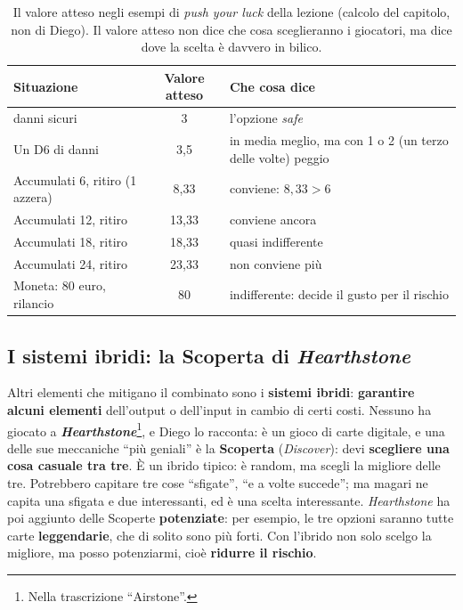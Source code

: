 \begin{table}[htbp]
\centering
\small
\begin{tabular}{@{}>{\raggedright\arraybackslash}p{4.6cm}c>{\raggedright\arraybackslash}p{6.6cm}@{}}
\toprule
\textbf{Situazione} & \textbf{Valore atteso} & \textbf{Che cosa dice} \\
\midrule
3 danni sicuri & 3 & l'opzione \emph{safe} \\
Un D6 di danni & 3,5 & in media meglio, ma con 1 o 2 (un terzo delle volte) peggio \\
\addlinespace
Accumulati 6, ritiro (1 azzera) & 8,33 & conviene: $8{,}33 > 6$ \\
Accumulati 12, ritiro & 13,33 & conviene ancora \\
Accumulati 18, ritiro & 18,33 & quasi indifferente \\
Accumulati 24, ritiro & 23,33 & non conviene più \\
\addlinespace
Moneta: 80 euro, rilancio & 80 & indifferente: decide il gusto per il rischio \\
\bottomrule
\end{tabular}
\caption{Il valore atteso negli esempi di \emph{push your luck} della lezione (calcolo del
capitolo, non di Diego). Il valore atteso non dice che cosa sceglieranno i giocatori, ma dice
dove la scelta è davvero in bilico.}
\label{a15:tab:push}
\end{table}

\subsection{I sistemi ibridi: la Scoperta di \emph{Hearthstone}}

Altri elementi che mitigano il combinato sono i \textbf{sistemi ibridi}: \textbf{garantire
alcuni elementi} dell'output o dell'input in cambio di certi costi. Nessuno ha giocato a
\textbf{\emph{Hearthstone}}\footnote{Nella trascrizione ``Airstone''.}, e Diego lo racconta:
è un gioco di carte digitale, e una delle sue meccaniche ``più geniali'' è la
\textbf{Scoperta} (\emph{Discover}): devi \textbf{scegliere una cosa casuale tra tre}. È un
ibrido tipico: è random, ma scegli la migliore delle tre. Potrebbero capitare tre cose
``sfigate'', ``e a volte succede''; ma magari ne capita una sfigata e due interessanti, ed è
una scelta interessante. \emph{Hearthstone} ha poi aggiunto delle Scoperte
\textbf{potenziate}: per esempio, le tre opzioni saranno tutte carte
\textbf{leggendarie}, che di solito sono più forti. Con l'ibrido non solo scelgo la migliore,
ma posso potenziarmi, cioè \textbf{ridurre il rischio}.

